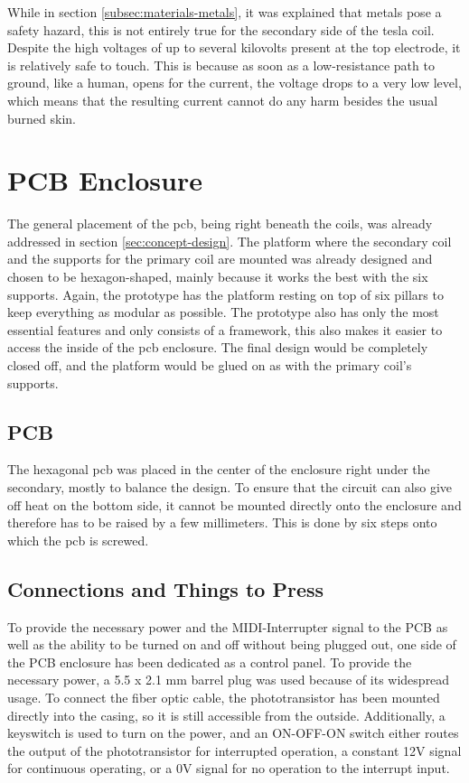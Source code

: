 While in section \ref{subsec:materials-metals}, it was explained that metals pose a safety hazard, this is not entirely true for the secondary side of the tesla coil. Despite the high voltages of up to several kilovolts present at the top electrode, it is relatively safe to touch. This is because as soon as a low-resistance path to ground, like a human, opens for the current, the voltage drops to a very low level, which means that the resulting current cannot do any harm besides the usual burned skin.

\section{PCB Enclosure}

The general placement of the \gls{pcb}, being right beneath the coils, was already addressed in section \ref{sec:concept-design}. The platform where the secondary coil and the supports for the primary coil are mounted was already designed and chosen to be hexagon-shaped, mainly because it works the best with the six supports. Again, the prototype has the platform resting on top of six pillars to keep everything as modular as possible. The prototype also has only the most essential features and only consists of a framework, this also makes it easier to access the inside of the \gls{pcb} enclosure. The final design would be completely closed off, and the platform would be glued on as with the primary coil’s supports.

\subsection{PCB}

The hexagonal \gls{pcb} was placed in the center of the enclosure right under the secondary, mostly to balance the design. To ensure that the circuit can also give off heat on the bottom side, it cannot be mounted directly onto the enclosure and therefore has to be raised by a few millimeters. This is done by six steps onto which the \gls{pcb} is screwed. 

\subsection{Connections and Things to Press}

To provide the necessary power and the MIDI-Interrupter signal to the PCB as well as the ability to be turned on and off without being plugged out, one side of the PCB enclosure has been dedicated as a control panel. To provide the necessary power, a 5.5 x 2.1 mm barrel plug was used because of its widespread usage. To connect the fiber optic cable, the phototransistor has been mounted directly into the casing, so it is still accessible from the outside. Additionally, a keyswitch is used to turn on the power, and an ON-OFF-ON switch either routes the output of the phototransistor for interrupted operation, a constant 12V signal for continuous operating, or a 0V signal for no operation to the interrupt input.
